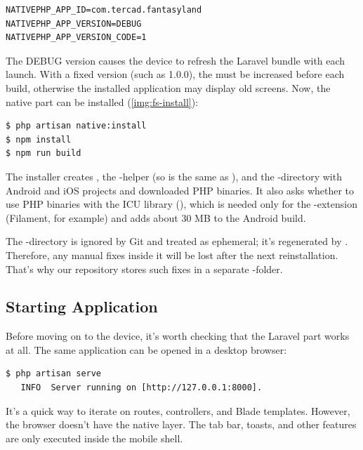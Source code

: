 \begin{lstlisting}[language=terminal]
NATIVEPHP_APP_ID=com.tercad.fantasyland
NATIVEPHP_APP_VERSION=DEBUG
NATIVEPHP_APP_VERSION_CODE=1
\end{lstlisting}

\noindent The DEBUG version causes the device to refresh the Laravel bundle with each launch.
With a fixed version (such as 1.0.0), the  must be increased
before each build, otherwise the installed application may display old screens. Now, the native
part can be installed (\cref{img:fs-install}):

\begin{lstlisting}[language=terminal]
$ php artisan native:install
$ npm install
$ npm run build
\end{lstlisting}

\noindent The installer creates , the -helper (so
 is the same as ), and the -directory
with Android and iOS projects and downloaded PHP binaries. It also asks whether to use PHP
binaries with the ICU library (), which is needed only for the -extension
(Filament, for example) and adds about 30 MB to the Android build.


\noindent The -directory is ignored by Git and treated as ephemeral; it's
regenerated by . Therefore, any manual fixes inside it will be lost after the
next reinstallation. That's why our repository stores such fixes in a separate
-folder.


\subsection{Starting Application}

Before moving on to the device, it's worth checking that the Laravel part works at all. The same
application can be opened in a desktop browser:

\begin{lstlisting}[language=terminal]
$ php artisan serve
   INFO  Server running on [http://127.0.0.1:8000].
\end{lstlisting}

\noindent It's a quick way to iterate on routes, controllers, and Blade templates. However, the
browser doesn't have the native layer. The tab bar, toasts, and other features are only executed
inside the mobile shell.


